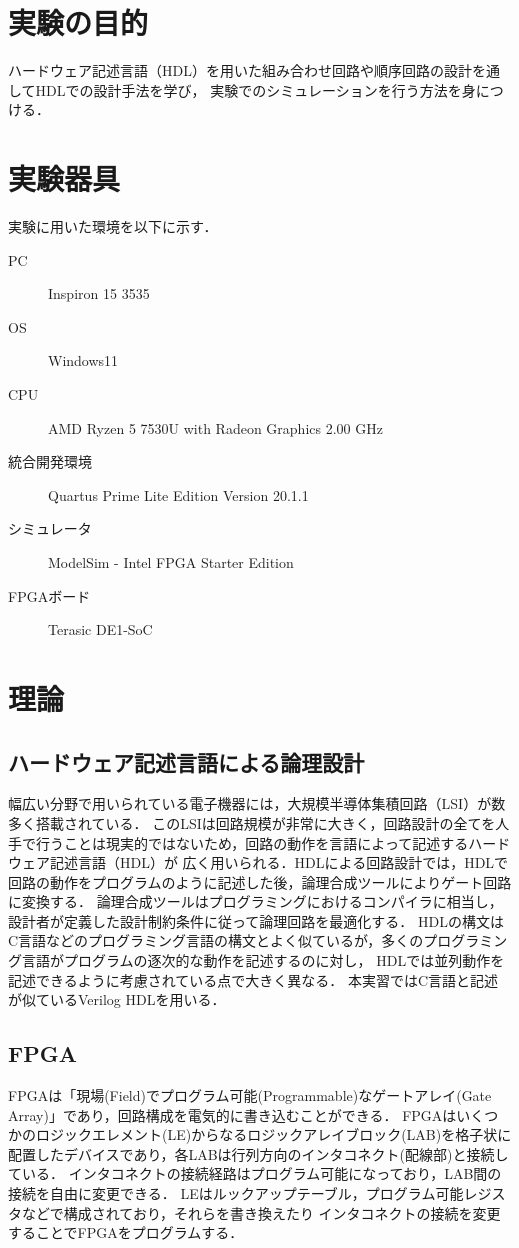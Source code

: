 \documentclass{jlreq}
\numberwithin{equation}{section}
\begin{document}
\tableofcontents
\clearpage

\section{実験の目的}
ハードウェア記述言語（HDL）を用いた組み合わせ回路や順序回路の設計を通してHDLでの設計手法を学び，
実験でのシミュレーションを行う方法を身につける．

\section{実験器具}
実験に用いた環境を以下に示す．
\begin{description}
	\item[PC] Inspiron 15 3535
	\item[OS] Windows11
	\item[CPU] AMD Ryzen 5 7530U with Radeon Graphics 2.00 GHz
	\item[統合開発環境] Quartus Prime Lite Edition Version 20.1.1
	\item[シミュレータ] ModelSim - Intel FPGA Starter Edition
	\item[FPGAボード] Terasic DE1-SoC
\end{description}

\section{理論}
\subsection{ハードウェア記述言語による論理設計}
幅広い分野で用いられている電子機器には，大規模半導体集積回路（LSI）が数多く搭載されている．
このLSIは回路規模が非常に大きく，回路設計の全てを人手で行うことは現実的ではないため，回路の動作を言語によって記述するハードウェア記述言語（HDL）が
広く用いられる．HDLによる回路設計では，HDLで回路の動作をプログラムのように記述した後，論理合成ツールによりゲート回路に変換する．
論理合成ツールはプログラミングにおけるコンパイラに相当し，設計者が定義した設計制約条件に従って論理回路を最適化する．
HDLの構文はC言語などのプログラミング言語の構文とよく似ているが，多くのプログラミング言語がプログラムの逐次的な動作を記述するのに対し，
HDLでは並列動作を記述できるように考慮されている点で大きく異なる．
本実習ではC言語と記述が似ているVerilog HDLを用いる．

\subsection{FPGA}
FPGAは「現場(Field)でプログラム可能(Programmable)なゲートアレイ(Gate Array)」であり，回路構成を電気的に書き込むことができる．
FPGAはいくつかのロジックエレメント(LE)からなるロジックアレイブロック(LAB)を格子状に配置したデバイスであり，各LABは行列方向のインタコネクト(配線部)と接続している．
インタコネクトの接続経路はプログラム可能になっており，LAB間の接続を自由に変更できる．
LEはルックアップテーブル，プログラム可能レジスタなどで構成されており，それらを書き換えたり
インタコネクトの接続を変更することでFPGAをプログラムする．
\end{document}
